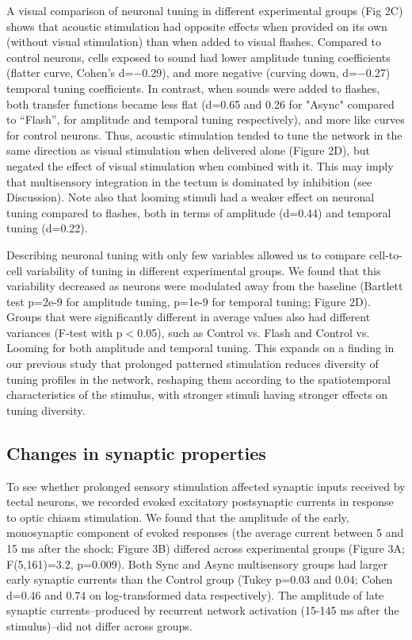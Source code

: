 \documentclass{article}
\begin{document}
A visual comparison of neuronal tuning in different experimental groups (Fig 2C) shows that acoustic stimulation had opposite effects when provided on its own (without visual stimulation) than when added to visual flashes. Compared to control neurons, cells exposed to sound had lower amplitude tuning coefficients (flatter curve, Cohen’s d=$-$0.29), and more negative (curving down, d=$-$0.27) temporal tuning coefficients. In contrast, when sounds were added to flashes, both transfer functions became less flat (d=0.65 and 0.26 for "Async" compared to “Flash”, for amplitude and temporal tuning respectively), and more like curves for control neurons. Thus, acoustic stimulation tended to tune the network in the same direction as visual stimulation when delivered alone (Figure 2D), but negated the effect of visual stimulation when combined with it. This may imply that multisensory integration in the tectum is dominated by inhibition (see Discussion). Note also that looming stimuli had a weaker effect on neuronal tuning compared to flashes, both in terms of amplitude (d=0.44) and temporal tuning (d=0.22).

Describing neuronal tuning with only few variables allowed us to compare cell-to-cell variability of tuning in different experimental groups. We found that this variability decreased as neurons were modulated away from the baseline (Bartlett test p=2e-9 for amplitude tuning, p=1e-9 for temporal tuning; Figure 2D). Groups that were significantly different in average values also had different variances (F-test with p$<$0.05), such as Control vs. Flash and Control vs. Looming for both amplitude and temporal tuning. This expands on a finding in our previous study \citep{ciarleglio2015} that prolonged patterned stimulation reduces diversity of tuning profiles in the network, reshaping them according to the spatiotemporal characteristics of the stimulus, with stronger stimuli having stronger effects on tuning diversity.

\subsection*{Changes in synaptic properties}

To see whether prolonged sensory stimulation affected synaptic inputs received by tectal neurons, we recorded evoked excitatory postsynaptic currents in response to optic chiasm stimulation. We found that the amplitude of the early, monosynaptic component of evoked responses (the average current between 5 and 15 ms after the shock; Figure 3B) differed across experimental groups (Figure 3A; F(5,161)=3.2, p=0.009). Both Sync and Async multisensory groups had larger early synaptic currents than the Control group (Tukey p=0.03 and 0.04; Cohen d=0.46 and 0.74 on log-transformed data respectively). The amplitude of late synaptic currents–produced by recurrent network activation (15-145 ms after the stimulus)–did not differ across groups.
\end{document}
